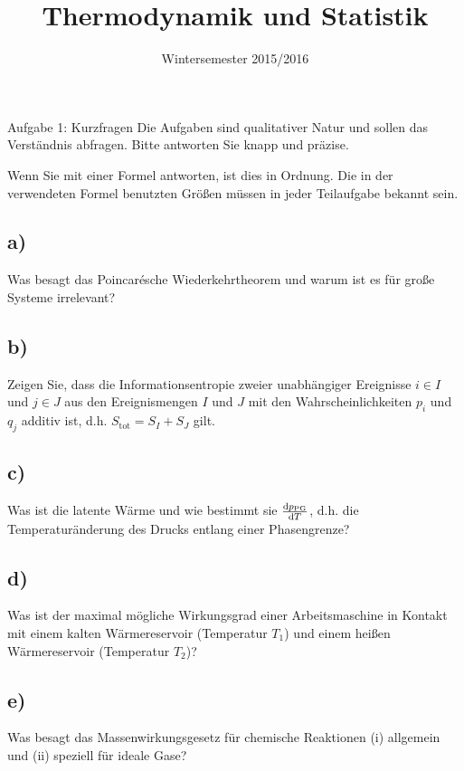 

\subject{TuS}
\title{Thermodynamik und Statistik}
\date{
    Wintersemester 2015/2016
}



\maketitle
\thispagestyle{empty}
\newpage


\begin{aufgabe}{Aufgabe 1: Kurzfragen}
Die Aufgaben sind qualitativer Natur und sollen das Verständnis abfragen.
Bitte antworten Sie knapp und präzise.

Wenn Sie mit einer Formel antworten, ist dies in Ordnung.
Die in der verwendeten Formel benutzten Größen müssen in jeder Teilaufgabe bekannt sein.

\subsection{a)}
Was besagt das Poincarésche Wiederkehrtheorem und warum ist es für große Systeme irrelevant?

\subsection{b)}
Zeigen Sie, dass die Informationsentropie zweier unabhängiger Ereignisse $i \in I$ und $j \in J$ aus den Ereignismengen $I$ und $J$ mit den Wahrscheinlichkeiten $p_i$ und $q_j$ additiv ist, d.h. $S_\text{tot} = S_I + S_J$ gilt.

\subsection{c)}
Was ist die latente Wärme und wie bestimmt sie $\frac{\mathrm{d} p_\text{PG}}{\mathrm{d} T}$, d.h. die Temperaturänderung des Drucks entlang einer Phasengrenze?


\subsection{d)}
Was ist der maximal mögliche Wirkungsgrad einer Arbeitsmaschine in Kontakt mit einem kalten Wärmereservoir (Temperatur $T_1$) und einem heißen Wärmereservoir (Temperatur $T_2$)?

\subsection{e)}
Was besagt das Massenwirkungsgesetz für chemische Reaktionen
(i) allgemein und
(ii) speziell für ideale Gase?


\end{aufgabe}
